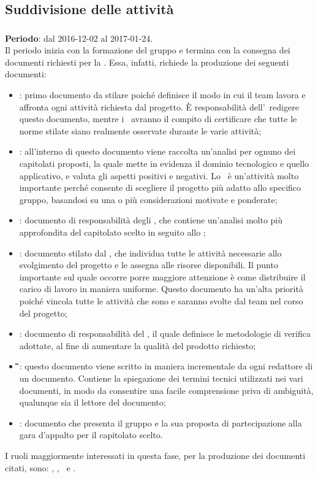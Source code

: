 	\subsection{Suddivisione delle attività}
		\subsubsection{\AR}
		\textbf{Periodo}: dal 2016-12-02 al 2017-01-24.\\
		Il periodo inizia con la formazione del gruppo e termina con la consegna dei documenti richiesti per la \RR. Essa, infatti, richiede la produzione dei seguenti documenti:
		\begin{itemize}
			\item \textbf{\NdP}: primo documento da stilare poiché definisce il modo in cui il team lavora e affronta ogni attività richiesta dal progetto. \MakeUppercase{è} responsabilità dell’\Amm\ redigere questo documento, mentre i \Vers\ avranno il compito di certificare che tutte le norme stilate siano realmente osservate durante le varie attività;
			\item \textbf{\SdF}: all'interno di questo documento viene raccolta un'analisi per ognuno dei capitolati proposti, la quale mette in evidenza il dominio tecnologico e quello applicativo, e valuta gli aspetti positivi e negativi. Lo \SdF\ è un’attività molto importante perché consente di scegliere il progetto più adatto allo specifico gruppo, basandosi su una o più considerazioni motivate e ponderate;
			\item \textbf{\AdR}: documento di responsabilità degli \Anas, che contiene un’analisi molto più approfondita del capitolato scelto in seguito allo \SdF;
			\item \textbf{\PdP}: documento stilato dal \RdP, che individua tutte le attività necessarie allo svolgimento del progetto e le assegna alle risorse disponibili. Il punto importante sul quale occorre porre maggiore attenzione è come distribuire il carico di lavoro in maniera uniforme. Questo documento ha un'alta priorità poiché vincola tutte le attività che sono e saranno svolte dal team nel corso del progetto;
			\item \textbf{\PdQ}: documento di responsabilità del \Ver, il quale definisce le metodologie di verifica adottate, al fine di aumentare la qualità del prodotto richiesto;
			\item \textbf{\G}: questo documento viene scritto in maniera incrementale da ogni redattore di un documento. Contiene la spiegazione dei termini tecnici utilizzati nei vari documenti, in modo da consentire una facile comprensione priva di ambiguità, qualunque sia il lettore del documento;
			\item \textbf{\LdP}: documento che presenta il gruppo e la sua proposta di partecipazione alla gara d’appalto per il capitolato scelto.
		\end{itemize}
		I ruoli maggiormente interessati in questa fase, per la produzione dei documenti citati, sono: \Amm, \Res, \Ana\ e \Ver.
		
